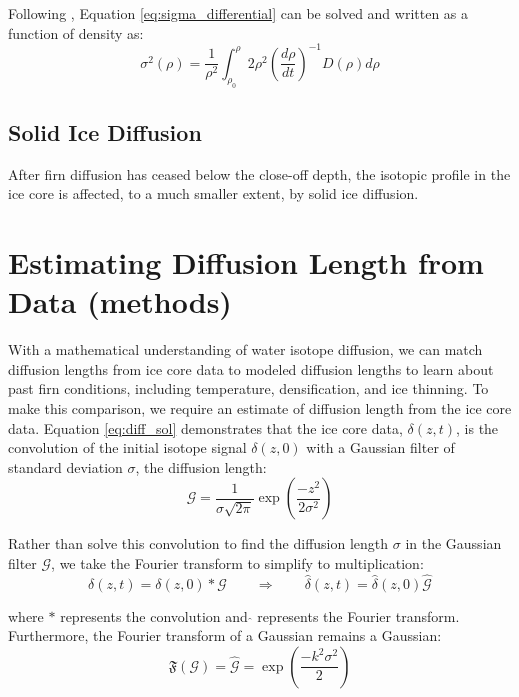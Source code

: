 \documentclass[draft, jgrga]{AGUTeX}
\begin{document}
\begin{article}
Following \citet{Gkinis2014}, Equation \ref{eq:sigma_differential} can be solved and written as a function of density as:
\begin{equation}
  \label{eq:sigma(density)}
  \sigma^2(\rho) = \frac{1}{\rho^2} \int^{\rho}_{\rho_0} 2 \rho^2 \left(\frac{d\rho}{dt}\right)^{-1} D(\rho) d\rho
\end{equation}

\subsection{Solid Ice Diffusion}

After firn diffusion has ceased below the close-off depth, the isotopic profile in the ice core is affected, to a much smaller extent, by solid ice diffusion.


\section{Estimating Diffusion Length from Data (methods)}

With a mathematical understanding of water isotope diffusion, we can match diffusion lengths from ice core data to modeled diffusion lengths to learn about past firn conditions, including temperature, densification, and ice thinning. To make this comparison, we require an estimate of diffusion length from the ice core data. Equation \ref{eq:diff_sol} demonstrates that the ice core data, $\delta(z,t)$, is the convolution of the initial isotope signal $\delta(z,0)$ with a Gaussian filter of standard deviation $\sigma$, the diffusion length:
\begin{equation}
\mathcal{G} = \frac{1}{\sigma \sqrt{2\pi}} \exp \left( \frac{-z^2}{2\sigma^2} \right)
\end{equation}

Rather than solve this convolution to find the diffusion length $\sigma$ in the Gaussian filter $\mathcal{G}$, we take the Fourier transform to simplify to multiplication:
\begin{equation}
  \delta(z,t) = \delta(z,0)*\mathcal{G} \qquad \Rightarrow \qquad \hat{\delta}(z,t) = \hat{\delta}(z,0)\hat{\mathcal{G}}
\end{equation}

where $*$ represents the convolution and \quad $\hat{}$ \quad represents the Fourier transform. Furthermore, the Fourier transform of a Gaussian remains a Gaussian:
\begin{equation}
\mathfrak{F}(\mathcal{G}) = \hat{\mathcal{G}} = \exp \left( \frac{-k^2\sigma^2}{2} \right)
\end{equation}


\end{article}
\end{document}
